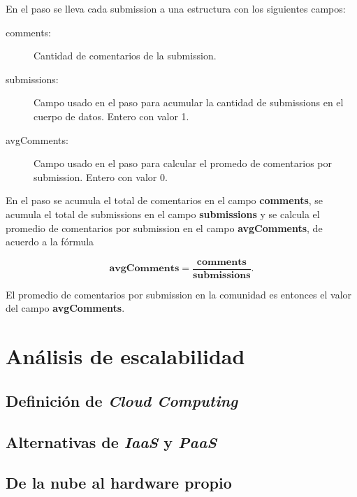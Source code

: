 \documentclass[a4paper,10pt,twoside]{article}
\begin{document}
En el paso \map se lleva cada submission a una estructura con los siguientes campos:

\begin{description}
	\item[comments:] Cantidad de comentarios de la submission.
	\item[submissions:] Campo usado en el paso \reduce para acumular la cantidad de submissions en el cuerpo de datos. Entero con valor 1.
	\item[avgComments:] Campo usado en el paso \reduce para calcular el promedo de comentarios por submission. Entero con valor 0.
\end{description}

En el paso \reduce se acumula el total de comentarios en el campo \textbf{comments}, se acumula el total de submissions en el campo \textbf{submissions} y se calcula el promedio de comentarios por submission en el campo \textbf{avgComments}, de acuerdo a la fórmula

$$\textbf{avgComments} = \frac{\textbf{comments}}{\textbf{submissions}}.$$

El promedio de comentarios por submission en la comunidad es entonces el valor del campo \textbf{avgComments}.




\section{Análisis de escalabilidad}


\subsection{Definición de \emph{Cloud Computing}}


\subsection{Alternativas de \emph{IaaS} y \emph{PaaS}}


\subsection{De la nube al hardware propio}
\end{document}
